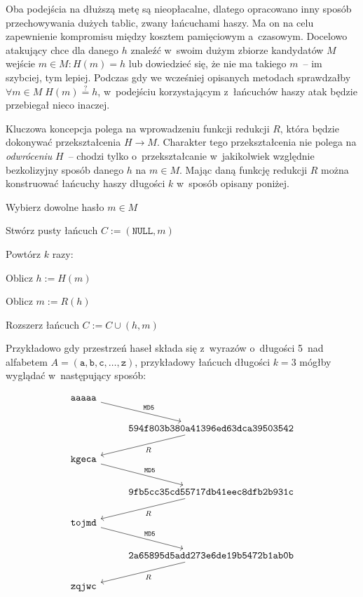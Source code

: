 Oba podejścia na dłuższą metę są nieopłacalne, dlatego opracowano inny sposób
przechowywania dużych tablic, zwany łańcuchami haszy. Ma on na celu zapewnienie
kompromisu między kosztem pamięciowym a~czasowym. Docelowo atakujący chce dla
danego $h$ znaleźć w~swoim dużym zbiorze kandydatów $M$ wejście $m \in M : H(m)
= h$ lub dowiedzieć się, że nie ma takiego $m$~-- im szybciej, tym lepiej.
Podczas gdy we wcześniej opisanych metodach sprawdzałby $\forall m \in M \;
H(m) \stackrel{?}{=} h$, w~podejściu korzystającym z~łańcuchów haszy atak
będzie przebiegał nieco inaczej.

Kluczowa koncepcja polega na wprowadzeniu funkcji redukcji $R$, która będzie
dokonywać przekształcenia $H \to M$. Charakter tego przekształcenia nie polega
na \emph{odwróceniu} $H$~-- chodzi tylko o~przekształcanie w~jakikolwiek
względnie bezkolizyjny sposób danego $h$ na $m \in M$. Mając daną funkcję
redukcji $R$ można konstruować łańcuchy haszy długości $k$ w~sposób opisany
poniżej.

\begin{myenumerate}

    \item Wybierz dowolne hasło $m \in M$

    \item Stwórz pusty łańcuch $C := (\texttt{NULL}, m)$

    \item Powtórz $k$ razy:

    \begin{myenumerate}

        \item Oblicz $h := H(m)$

        \item Oblicz $m := R(h)$

        \item Rozszerz łańcuch $C := C \cup (h, m)$

    \end{myenumerate}

\end{myenumerate}

Przykładowo gdy przestrzeń haseł składa się z~wyrazów o~długości 5~nad
alfabetem $A = (\mathtt{a}, \mathtt{b}, \mathtt{c}, \ldots, \mathtt{z})$,
przykładowy łańcuch długości $k=3$ mógłby wyglądać w~następujący sposób:

\[
\begin{tikzcd}
    \mathtt{aaaaa} \arrow{rd}{\mathtt{MD5}} & \\
    & \arrow{ld}{R} \mathtt{594f803b380a41396ed63dca39503542} \\
    \mathtt{kgeca} \arrow{rd}{\mathtt{MD5}} & \\
    & \arrow{ld}{R} \mathtt{9fb5cc35cd55717db41eec8dfb2b931c} \\
    \mathtt{tojmd} \arrow{rd}{\mathtt{MD5}} & \\
    & \arrow{ld}{R} \mathtt{2a65895d5add273e6de19b5472b1ab0b} \\
    \mathtt{zqjwc}
\end{tikzcd}
\]

